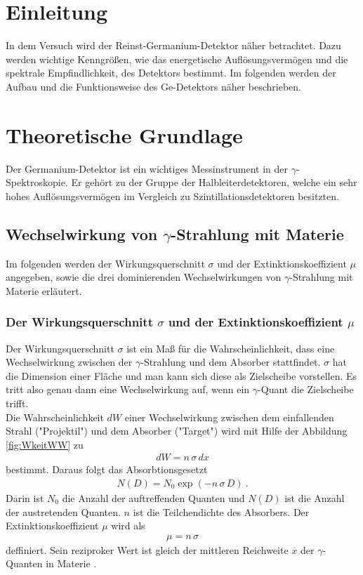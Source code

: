 \section{Einleitung}
In dem Versuch wird der Reinst-Germanium-Detektor näher betrachtet. Dazu werden wichtige Kenngrößen, wie das energetische Auflösungsvermögen und die spektrale Empfindlichkeit, des Detektors bestimmt. Im folgenden werden der Aufbau und die Funktionsweise des Ge-Detektors näher beschrieben.



\section{Theoretische Grundlage}
\label{sec:Theorie}
Der Germanium-Detektor ist ein wichtiges Messinstrument in der $\gamma$-Spektroskopie. Er gehört zu der Gruppe der Halbleiterdetektoren, welche ein sehr hohes Auflösungsvermögen im Vergleich zu Szintillationsdetektoren besitzten.



\subsection{Wechselwirkung von \texorpdfstring{$\gamma$}{}-Strahlung mit Materie}
Im folgenden werden der Wirkungsquerschnitt $\sigma$ und der Extinktionskoeffizient $\mu$ angegeben, sowie die drei dominierenden Wechselwirkungen von $\gamma$-Strahlung mit Materie erläutert.



\subsubsection{Der Wirkungsquerschnitt \texorpdfstring{$\sigma$}{} und der Extinktionskoeffizient \texorpdfstring{$\mu$}{}}
Der Wirkungsquerschnitt $\sigma$ ist ein Maß für die Wahrscheinlichkeit, dass eine Wechselwirkung zwischen der $\gamma$-Strahlung und dem Absorber stattfindet. $\sigma$ hat die Dimension einer Fläche und man kann sich diese als Zielscheibe vorstellen.  Es tritt also genau dann eine Wechselwirkung auf, wenn ein $\gamma$-Quant die Zielscheibe trifft. \\
Die Wahrscheinlichkeit $dW$ einer Wechselwirkung zwischen dem einfallenden Strahl ("Projektil") und dem Absorber ("Target") wird mit Hilfe der Abbildung \eqref{fig:WkeitWW} zu
\begin{align}
	dW = n\,\sigma\,dx
\end{align}
bestimmt. Daraus folgt das Absorbtionsgesetzt 
\begin{align}
	N(D) = N_0 \exp(-n\,\sigma\,D) \ .
\end{align}
Darin ist $N_0$ die Anzahl der auftreffenden Quanten und $N(D)$ ist die Anzahl der austretenden Quanten. $n$ ist die Teilchendichte des Absorbers. Der Extinktionskoeffizient $\mu$ wird als
\begin{align}
	\mu = n\,\sigma
\end{align}
deffiniert. Sein reziproker Wert ist gleich der mittleren Reichweite $\overline{x}$ der $\gamma$-Quanten in Materie \cite[2]{V18}.

